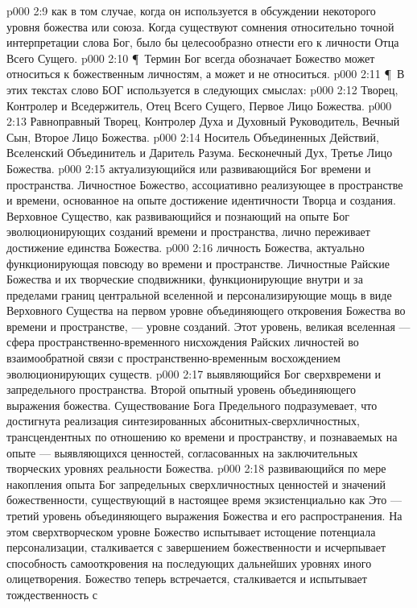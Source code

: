 \vs p000 2:9  как в том случае, когда он используется в обсуждении некоторого уровня божества или союза. Когда существуют сомнения относительно точной интерпретации слова Бог, было бы целесообразно отнести его к личности Отца Всего Сущего.
\vs p000 2:10 \P\ Термин Бог всегда обозначает  Божество может относиться к божественным личностям, а может и не относиться.
\vs p000 2:11 \P\ В этих текстах слово БОГ используется в следующих смыслах:
\vs p000 2:12 \bibnobreakspace {} Творец, Контролер и Вседержитель, Отец Всего Сущего, Первое Лицо Божества.
\vs p000 2:13 \bibnobreakspace {} Равноправный Творец, Контролер Духа и Духовный Руководитель, Вечный Сын, Второе Лицо Божества.
\vs p000 2:14 \bibnobreakspace {} Носитель Объединенных Действий, Вселенский Объединитель и Даритель Разума. Бесконечный Дух, Третье Лицо Божества.
\vs p000 2:15 \bibnobreakspace {} актуализующийся или развивающийся Бог времени и пространства. Личностное Божество, ассоциативно реализующее в пространстве и времени, основанное на опыте достижение идентичности Творца и создания. Верховное Существо, как развивающийся и познающий на опыте Бог эволюционирующих созданий времени и пространства, лично переживает достижение единства Божества.
\vs p000 2:16 \bibnobreakspace {} личность Божества, актуально функционирующая повсюду во времени и пространстве. Личностные Райские Божества и их творческие сподвижники, функционирующие внутри и за пределами границ центральной вселенной и персонализирующие мощь в виде Верховного Существа на первом уровне объединяющего откровения Божества во времени и пространстве, --- уровне созданий. Этот уровень, великая вселенная --- сфера пространственно\hyp{}временного нисхождения Райских личностей во взаимообратной связи с пространственно\hyp{}временным восхождением эволюционирующих существ.
\vs p000 2:17 \bibnobreakspace {} выявляющийся Бог сверхвремени и запредельного пространства. Второй опытный уровень объединяющего выражения божества. Существование Бога Предельного подразумевает, что достигнута реализация синтезированных абсонитных\hyp{}сверхличностных, трансцендентных по отношению ко времени и пространству, и познаваемых на опыте --- выявляющихся ценностей, согласованных на заключительных творческих уровнях реальности Божества.
\vs p000 2:18 \bibnobreakspace {} развивающийся по мере накопления опыта Бог запредельных сверхличностных ценностей и значений божественности, существующий в настоящее время экзистенциально как  Это --- третий уровень объединяющего выражения Божества и его распространения. На этом сверхтворческом уровне Божество испытывает истощение потенциала персонализации, сталкивается с завершением божественности и исчерпывает способность самооткровения на последующих дальнейших уровнях иного олицетворения. Божество теперь встречается, сталкивается и испытывает тождественность с 
